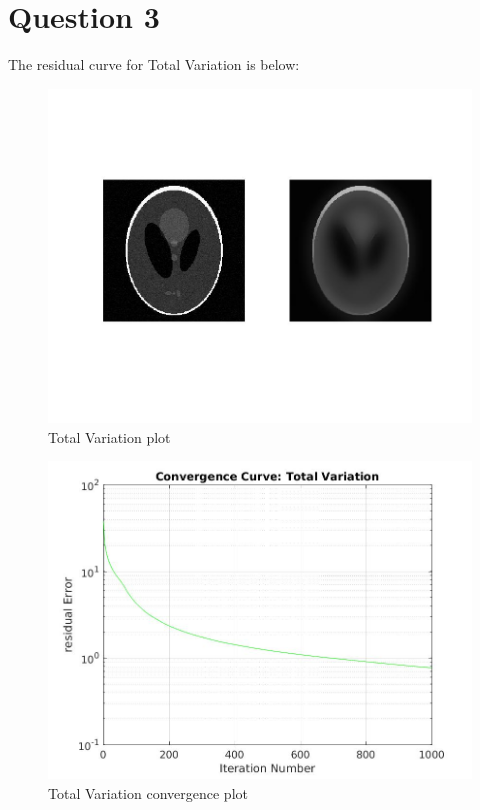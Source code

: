 \documentclass{article}
\begin{document}
\section*{Question 3}

The residual curve for Total Variation is below:

\begin{figure}[H]
\centering
\includegraphics[width=1.2\linewidth]{TVplot.jpg}
\caption{Total Variation plot}
\end{figure}


\begin{figure}[H]
\centering
\includegraphics[width=1.2\linewidth]{TV_residual.jpg}
\caption{Total Variation convergence plot}
\end{figure}
\end{document}
